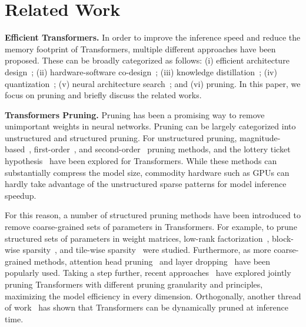 \vspace{-2.5mm}
\section{Related Work}
\label{sec:related}
\vspace{-1mm}

\textbf{Efficient Transformers.} 
In order to improve the inference speed and reduce the memory footprint of Transformers, multiple different approaches have been proposed.
These can be broadly categorized as follows:
(i) efficient architecture design~\cite{iandola2020squeezebert,kitaev2019reformer, lan2019albert,sun2020mobilebert, wang2020linformer,wu2020lite};
(ii) hardware-software co-design~\cite{ham20203, ham2021elsa, tambe2021edgebert, wang2021spatten};
(iii) knowledge distillation~\cite{jiao2019tinybert, sanh2019distilbert,sun2019patient, wang2020minilm};
(iv) quantization~\cite{kim2021bert, shen2020q, zadeh2020gobo, zafrir2019q8bert};
(v) neural architecture search~\cite{chen2020adabert, so2019evolved, so2021primer,  wang2020hat, xu2021bert, yin2021autotinybert};
and (vi) pruning.
In this paper, we focus on pruning and briefly discuss the related works.

\textbf{Transformers Pruning.}
Pruning has been a promising way to remove unimportant weights in neural networks.
Pruning can be largely categorized into unstructured and structured pruning. 
For unstructured pruning, magnitude-based~\cite{gale2019state}, first-order~\cite{sanh2020movement}, and second-order~\cite{kurtic2022optimal} pruning methods, and the lottery ticket hypothesis~\cite{chen2020lottery, chen2020earlybert, frankle2018lottery, prasanna2020bert} have been explored for Transformers.
While these methods can substantially compress the model size, commodity hardware such as GPUs can hardly take advantage of the unstructured sparse patterns for model inference speedup.

For this reason, a number of structured pruning methods have been introduced to remove coarse-grained sets of parameters in Transformers.
For example, to prune structured sets of parameters in weight matrices, low-rank factorization~\cite{wang2019structured}, block-wise sparsity~\cite{li2020efficient}, and tile-wise sparsity~\cite{guo2020accelerating} were studied.
Furthermore, as more coarse-grained methods, attention head pruning~\cite{michel2019sixteen, voita2019analyzing} and layer dropping~\cite{fan2019reducing, sajjad2020effect} have been popularly used.
Taking a step further, recent approaches~\cite{chen2021chasing, khetan2020schubert,  lagunas2021block, lin2020pruning, liu2021rosita, xia2022structured, yao2021mlpruning} have explored jointly pruning Transformers with different pruning granularity and principles, maximizing the model efficiency in every dimension.
Orthogonally, another thread of work~\cite{fan2019reducing, hou2020dynabert, liu2021ebert, xin2020deebert, zhou2020bert} has shown that Transformers can be dynamically pruned at inference time.

